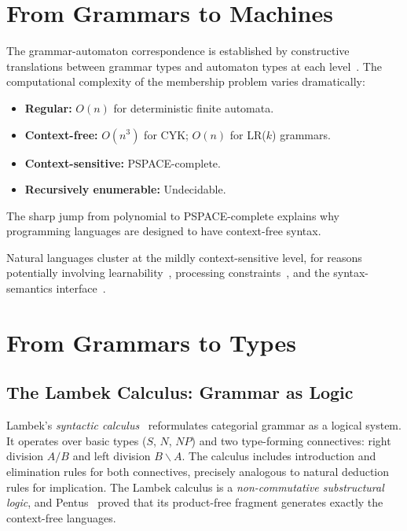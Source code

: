 \documentclass[12pt,a4paper]{article}
\begin{document}
\section{From Grammars to Machines}

The grammar-automaton correspondence is established by constructive
translations between grammar types and automaton types at each
level~\cite{Kleene1956,Chomsky1962,Kuroda1964}. The computational complexity
of the membership problem varies dramatically:

\begin{itemize}
  \item \textbf{Regular:} $O(n)$ for deterministic finite automata.
  \item \textbf{Context-free:} $O(n^3)$ for CYK; $O(n)$ for LR($k$) grammars.
  \item \textbf{Context-sensitive:} PSPACE-complete.
  \item \textbf{Recursively enumerable:} Undecidable.
\end{itemize}

The sharp jump from polynomial to PSPACE-complete explains why programming
languages are designed to have context-free syntax.

Natural languages cluster at the mildly context-sensitive level, for reasons
potentially involving learnability~\cite{Joshi1985}, processing
constraints~\cite{Stabler2013}, and the syntax-semantics
interface~\cite{Steedman2000}.

\section{From Grammars to Types}

\subsection{The Lambek Calculus: Grammar as Logic}

Lambek's \emph{syntactic calculus}~\cite{Lambek1958} reformulates categorial
grammar as a logical system. It operates over basic types ($S$, $N$, $NP$) and
two type-forming connectives: right division $A/B$ and left division
$B \backslash A$. The calculus includes introduction and elimination rules for
both connectives, precisely analogous to natural deduction rules for
implication. The Lambek calculus is a \emph{non-commutative substructural
logic}, and Pentus~\cite{Pentus1997} proved that its product-free fragment
generates exactly the context-free languages.
\end{document}
